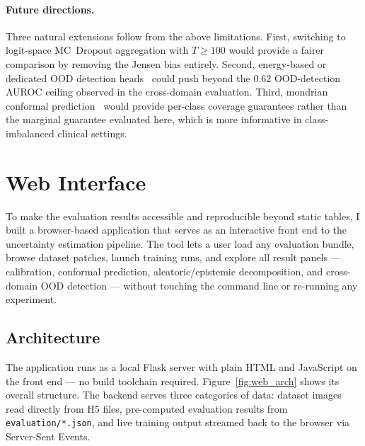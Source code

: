 \paragraph{Future directions.} Three natural extensions follow from the above limitations. First, switching to logit-space MC~Dropout aggregation with $T \geq 100$ would provide a fairer comparison by removing the Jensen bias entirely. Second, energy-based or dedicated OOD detection heads~\cite{liu2020energy} could push beyond the $0.62$ OOD-detection AUROC ceiling observed in the cross-domain evaluation. Third, mondrian conformal prediction~\cite{vovk2005algorithmic} would provide per-class coverage guarantees rather than the marginal guarantee evaluated here, which is more informative in class-imbalanced clinical settings.


\section{Web Interface}
\label{sec:web_interface}

To make the evaluation results accessible and reproducible beyond static tables, I built a browser-based application that serves as an interactive front end to the uncertainty estimation pipeline. The tool lets a user load any evaluation bundle, browse dataset patches, launch training runs, and explore all result panels --- calibration, conformal prediction, aleatoric/epistemic decomposition, and cross-domain OOD detection --- without touching the command line or re-running any experiment.

\subsection{Architecture}

The application runs as a local Flask server with plain HTML and JavaScript on the front end --- no build toolchain required. Figure~\ref{fig:web_arch} shows its overall structure. The backend serves three categories of data: dataset images read directly from H5 files, pre-computed evaluation results from \texttt{evaluation/*.json}, and live training output streamed back to the browser via Server-Sent Events.



